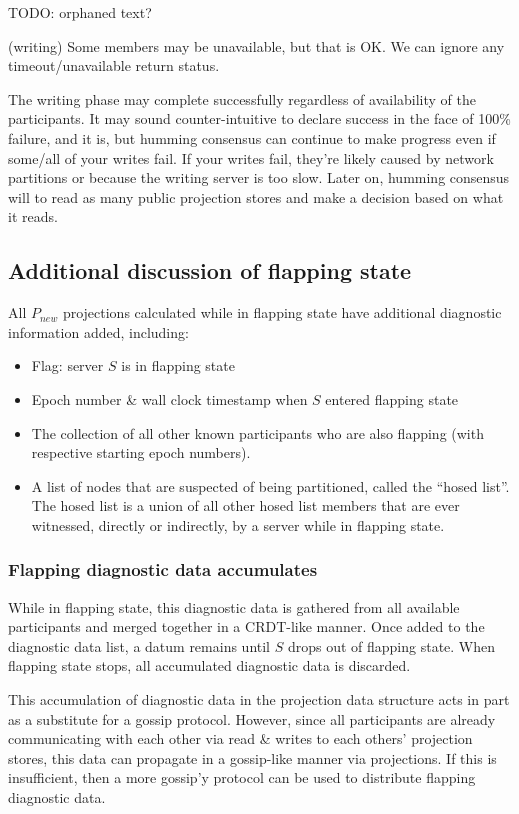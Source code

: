 \documentclass[preprint,10pt]{sigplanconf}
\begin{document}
TODO: orphaned text?

(writing) Some members may be unavailable, but that is OK.  We can ignore any
timeout/unavailable return status.

The writing phase may complete successfully regardless of availability
of the participants.  It may sound counter-intuitive to declare
success in the face of 100\% failure, and it is, but humming consensus
can continue to make progress even if some/all of your writes fail.
If your writes fail, they're likely caused by network partitions or
because the writing server is too slow.  Later on, humming consensus will
to read as many public projection stores and make a decision based on
what it reads.

\subsection{Additional discussion of flapping state}
\label{sub:flapping-state}
All $P_{new}$ projections
calculated while in flapping state have additional diagnostic
information added, including:

\begin{itemize}
\item Flag: server $S$ is in flapping state
\item Epoch number \& wall clock timestamp when $S$ entered flapping state
\item The collection of all other known participants who are also
  flapping (with respective starting epoch numbers).
\item A list of nodes that are suspected of being partitioned, called the
  ``hosed list''.  The hosed list is a union of all other hosed list
  members that are ever witnessed, directly or indirectly, by a server
  while in flapping state.
\end{itemize}

\subsubsection{Flapping diagnostic data accumulates}

While in flapping state, this diagnostic data is gathered from
all available participants and merged together in a CRDT-like manner.
Once added to the diagnostic data list, a datum remains until
$S$ drops out of flapping state.  When flapping state stops, all
accumulated diagnostic data is discarded.

This accumulation of diagnostic data in the projection data
structure acts in part as a substitute for a gossip protocol.
However, since all participants are already communicating with each
other via read \& writes to each others' projection stores, this
data can propagate in a gossip-like manner via projections.  If
this is insufficient, then a more gossip'y protocol can be used to
distribute flapping diagnostic data.
\end{document}
